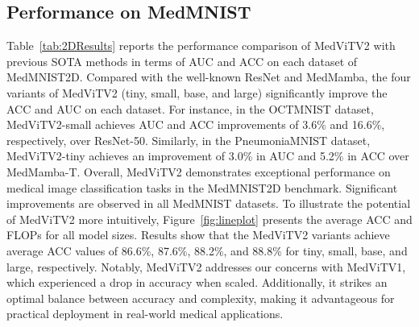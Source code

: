 \documentclass[times,twocolumn,final]{elsarticle}
\begin{document}
\subsection{Performance on MedMNIST}

Table~\ref{tab:2DResults} reports the performance comparison of MedViTV2 with previous SOTA methods in terms of AUC and ACC on each dataset of MedMNIST2D. Compared with the well-known ResNet and MedMamba, the four variants of MedViTV2 (tiny, small, base, and large) significantly improve the ACC and AUC on each dataset. For instance, in the OCTMNIST dataset, MedViTV2-small achieves AUC and ACC improvements of 3.6\% and 16.6\%, respectively, over ResNet-50. Similarly, in the PneumoniaMNIST dataset, MedViTV2-tiny achieves an improvement of 3.0\% in AUC and 5.2\% in ACC over MedMamba-T.
Overall, MedViTV2 demonstrates exceptional performance on medical image classification tasks in the MedMNIST2D benchmark. Significant improvements are observed in all MedMNIST datasets. To illustrate the potential of MedViTV2 more intuitively, Figure~\ref{fig:lineplot} presents the average ACC and FLOPs for all model sizes. Results show that the MedViTV2 variants achieve average ACC values of 86.6\%, 87.6\%, 88.2\%, and 88.8\% for tiny, small, base, and large, respectively. Notably, MedViTV2 addresses our concerns with MedViTV1, which experienced a drop in accuracy when scaled. Additionally, it strikes an optimal balance between accuracy and complexity, making it advantageous for practical deployment in real-world medical applications.
\end{document}
